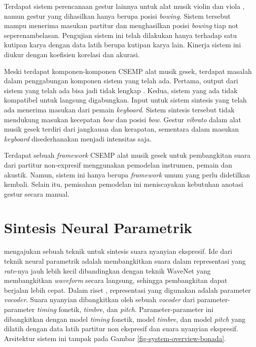 Terdapat sistem perencanaan gestur lainnya untuk alat musik violin dan viola \parencite{yu2017bowing}, namun gestur yang dihasilkan hanya berupa posisi \textit{bowing}. Sistem tersebut mampu menerima masukan partitur dan menghasilkan posisi \textit{bowing} tiap not seperenambelasan. Pengujian sistem ini telah dilakukan hanya terhadap satu kutipan karya dengan data latih berupa kutipan karya lain. Kinerja sistem ini diukur dengan koefisien korelasi dan akurasi.

Meski terdapat komponen-komponen CSEMP alat musik gesek, terdapat masalah dalam penggabungan komponen sistem yang telah ada. Pertama, output dari sistem yang telah ada bisa jadi tidak lengkap \parencite{yu2017bowing}. Kedua, sistem yang ada tidak kompatibel untuk langsung digabungkan. Input untuk sistem sintesis yang telah ada \parencite{lindemann2007rpm} menerima masukan dari pemain \textit{keyboard}. Sistem sintesis tersebut tidak mendukung masukan kecepatan \textit{bow} \parencite{marchini2014quartet}\parencite{yu2017bowing} dan posisi \textit{bow}\parencite{yu2017bowing}. Gestur \textit{vibrato} dalam alat musik gesek terdiri dari jangkauan dan kerapatan, sementara dalam masukan \textit{keyboard} disederhanakan menjadi intensitas saja.

Terdapat sebuah \textit{framework} CSEMP alat musik gesek untuk pembangkitan suara dari partitur non-expresif \parencite{perez2015} menggunakan pemodelan instrumen, pemain dan akustik. Namun, sistem ini hanya berupa \textit{framework} umum yang perlu didetilkan kembali. Selain itu, pemisahan pemodelan ini meniscayakan kebutuhan anotasi gestur secara manual.

\section{Sintesis Neural Parametrik} \label{literature-neural-parametric}

\citet{bonada2017singing} mengajukan sebuah teknik untuk sintesis suara nyanyian ekspresif. Ide dari teknik neural parametrik \parencite{bonada2017singing} adalah membangkitkan suara dalam representasi yang \textit{rate}-nya jauh lebih kecil dibandingkan dengan teknik WaveNet\parencite{Oord2016WaveNetAG} yang membangkitkan \textit{waveform} secara langsung, sehingga pembangkitan dapat berjalan lebih cepat. Dalam riset \citet{bonada2017singing}, representasi yang digunakan adalah parameter \textit{vocoder}. Suara nyanyian dibangkitkan oleh sebuah \textit{vocoder} dari parameter-parameter \textit{timing} fonetik, \textit{timbre}, dan \textit{pitch}. Parameter-parameter ini dibangkitkan dengan model \textit{timing} fonetik, model \textit{timbre}, dan model \textit{pitch} yang dilatih dengan data latih partitur non ekspresif dan suara nyanyian ekspresif. Arsitektur sistem ini tampak pada Gambar \ref{fig-system-overview-bonada}.

